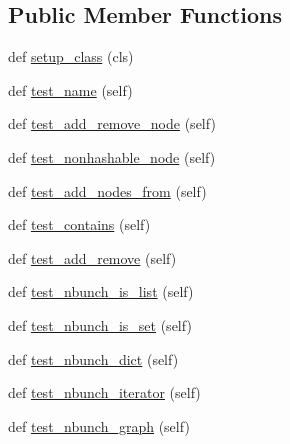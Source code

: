 \subsection*{Public Member Functions}
\begin{DoxyCompactItemize}
\item 
def \hyperlink{classnetworkx_1_1classes_1_1tests_1_1historical__tests_1_1HistoricalTests_ad727a85cc5672e22bb56ac598aa5db71}{setup\+\_\+class} (cls)
\item 
def \hyperlink{classnetworkx_1_1classes_1_1tests_1_1historical__tests_1_1HistoricalTests_a37fcfc46f1fa1a7db0012d8d32fb8fd3}{test\+\_\+name} (self)
\item 
def \hyperlink{classnetworkx_1_1classes_1_1tests_1_1historical__tests_1_1HistoricalTests_afbd8a9332fc64249023273432346d1d6}{test\+\_\+add\+\_\+remove\+\_\+node} (self)
\item 
def \hyperlink{classnetworkx_1_1classes_1_1tests_1_1historical__tests_1_1HistoricalTests_a3890ae79446d3f48f11d411861043fc3}{test\+\_\+nonhashable\+\_\+node} (self)
\item 
def \hyperlink{classnetworkx_1_1classes_1_1tests_1_1historical__tests_1_1HistoricalTests_aa25bcfe133bc32716247325eb87894d3}{test\+\_\+add\+\_\+nodes\+\_\+from} (self)
\item 
def \hyperlink{classnetworkx_1_1classes_1_1tests_1_1historical__tests_1_1HistoricalTests_a77f22998f24f63410ad1cde74039d378}{test\+\_\+contains} (self)
\item 
def \hyperlink{classnetworkx_1_1classes_1_1tests_1_1historical__tests_1_1HistoricalTests_ac4ebba31039394c483972aafb26c1d3b}{test\+\_\+add\+\_\+remove} (self)
\item 
def \hyperlink{classnetworkx_1_1classes_1_1tests_1_1historical__tests_1_1HistoricalTests_a8943207e2b22d808683fae0407d13347}{test\+\_\+nbunch\+\_\+is\+\_\+list} (self)
\item 
def \hyperlink{classnetworkx_1_1classes_1_1tests_1_1historical__tests_1_1HistoricalTests_a0a78e601b2c9de55c140ce0ddad87e1c}{test\+\_\+nbunch\+\_\+is\+\_\+set} (self)
\item 
def \hyperlink{classnetworkx_1_1classes_1_1tests_1_1historical__tests_1_1HistoricalTests_ab84eae08c5ea88b46edcdd99b28fe410}{test\+\_\+nbunch\+\_\+dict} (self)
\item 
def \hyperlink{classnetworkx_1_1classes_1_1tests_1_1historical__tests_1_1HistoricalTests_a10fd66ad24111f23921383c77248e169}{test\+\_\+nbunch\+\_\+iterator} (self)
\item 
def \hyperlink{classnetworkx_1_1classes_1_1tests_1_1historical__tests_1_1HistoricalTests_a738b6e0f83d977d2fe31b715b3e33042}{test\+\_\+nbunch\+\_\+graph} (self)

\end{DoxyCompactItemize}
